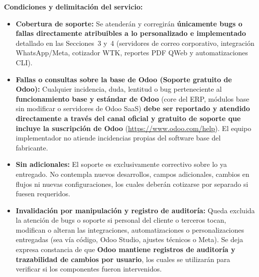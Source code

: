 \documentclass[10pt,a4paper]{article}
\begin{document}
\vspace{0.3em}
\noindent
\textbf{Condiciones y delimitación del servicio:}
\begin{itemize}
  \item \textbf{Cobertura de soporte:} Se atenderán y corregirán \textbf{únicamente bugs o fallas directamente atribuibles a lo personalizado e implementado} detallado en las Secciones~3 y~4 (servidores de correo corporativo, integración WhatsApp/Meta, cotizador WTK, reportes PDF QWeb y automatizaciones CLI).
  \item \textbf{Fallas o consultas sobre la base de Odoo (Soporte gratuito de Odoo):} Cualquier incidencia, duda, lentitud o bug perteneciente al \textbf{funcionamiento base y estándar de Odoo} (core del ERP, módulos base sin modificar o servidores de Odoo SaaS) \textbf{debe ser reportado y atendido directamente a través del canal oficial y gratuito de soporte que incluye la suscripción de Odoo} (\url{https://www.odoo.com/help}). El equipo implementador no atiende incidencias propias del software base del fabricante.
  \item \textbf{Sin adicionales:} El soporte es exclusivamente correctivo sobre lo ya entregado. No contempla nuevos desarrollos, campos adicionales, cambios en flujos ni nuevas configuraciones, los cuales deberán cotizarse por separado si fuesen requeridos.
  \item \textbf{Invalidación por manipulación y registro de auditoría:} Queda excluida la atención de bugs o soporte si personal del cliente o terceros tocan, modifican o alteran las integraciones, automatizaciones o personalizaciones entregadas (sea vía código, Odoo Studio, ajustes técnicos o Meta). Se deja expresa constancia de que \textbf{Odoo mantiene registros de auditoría y trazabilidad de cambios por usuario}, los cuales se utilizarán para verificar si los componentes fueron intervenidos.
\end{itemize}
\end{document}
